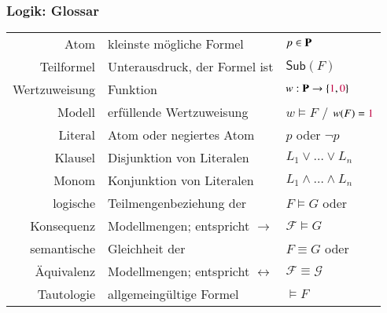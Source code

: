 \documentclass[onlymath]{beamer}
\begin{document}
\maketitle


\begin{frame}\frametitle{Logik: Glossar}

\begin{tabular}{@{}rll@{}}
\rowcolor{darkblue!10}
Atom & kleinste mögliche Formel & $p\in\textbf{\textcolor{black}{P}}$\\
%
Teilformel & Unterausdruck, der Formel ist & $\textsf{Sub}(F)$ \\
%
\rowcolor{darkblue!10}
Wertzuweisung & Funktion & $w:\textbf{\textcolor{black}{P}}\to\{\textcolor{purple}{1},\textcolor{purple}{0}\}$\\
%
Modell & erfüllende Wertzuweisung & $w\models F$ / $w(F)=\textcolor{purple}{1}$\\
%
\rowcolor{darkblue!10}
Literal & Atom oder negiertes Atom & $p$ oder $\neg p$\\
%
Klausel & Disjunktion von Literalen & $L_1\vee\ldots\vee L_n$ \\
%
\rowcolor{darkblue!10}
Monom & Konjunktion von Literalen & $L_1\wedge\ldots\wedge L_n$ \\
%
logische & Teilmengenbeziehung der  & $F\models G$ oder \\[-0.8ex]
Konsequenz & Modellmengen; entspricht $\to$ &  $\mathcal{F}\models G$\\
%
\rowcolor{darkblue!10}
semantische & Gleichheit der  & $F\equiv G$ oder \\[-0.8ex]
\rowcolor{darkblue!10}
Äquivalenz & Modellmengen; entspricht $\leftrightarrow$ &  $\mathcal{F}\equiv\mathcal{G}$\\
%
Tautologie & allgemeingültige Formel & $\models F$

\end{tabular}

\end{frame}
\end{document}
